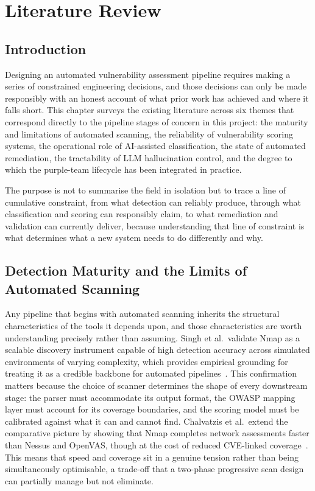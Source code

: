 \documentclass[12pt, a4paper, oneside]{report}
\begin{document}
\chapter{Literature Review}
\label{sec:lit-review}

\section{Introduction}

Designing an automated vulnerability assessment pipeline requires making
a series of constrained engineering decisions, and those decisions can
only be made responsibly with an honest account of what prior work has
achieved and where it falls short. This chapter surveys the existing
literature across six themes that correspond directly to the pipeline
stages of concern in this project: the maturity and limitations of
automated scanning, the reliability of vulnerability scoring systems,
the operational role of AI-assisted classification, the state of
automated remediation, the tractability of LLM hallucination control,
and the degree to which the purple-team lifecycle has been integrated in
practice.

The purpose is not to summarise the field in isolation but to trace a
line of cumulative constraint, from what detection can reliably produce,
through what classification and scoring can responsibly claim, to what
remediation and validation can currently deliver, because understanding
that line of constraint is what determines what a new system needs to do
differently and why.

\section{Detection Maturity and the Limits of \mbox{Automated} Scanning}

Any pipeline that begins with automated scanning inherits the structural
characteristics of the tools it depends upon, and those characteristics
are worth understanding precisely rather than assuming. Singh et al.\
validate Nmap as a scalable discovery instrument capable of high
detection accuracy across simulated environments of varying complexity,
which provides empirical grounding for treating it as a credible
backbone for automated pipelines~\cite{singh2024}. This confirmation
matters because the choice of scanner determines the shape of every
downstream stage: the parser must accommodate its output format, the
OWASP mapping layer must account for its coverage boundaries, and the
scoring model must be calibrated against what it can and cannot find.
Chalvatzis et al.\ extend the comparative picture by showing that Nmap
completes network assessments faster than Nessus and OpenVAS, though at
the cost of reduced CVE-linked coverage~\cite{chalvatzis2019}.
This means that speed and coverage sit in a genuine tension rather than
being simultaneously optimisable, a trade-off that a two-phase
progressive scan design can partially manage but not eliminate.
\end{document}
